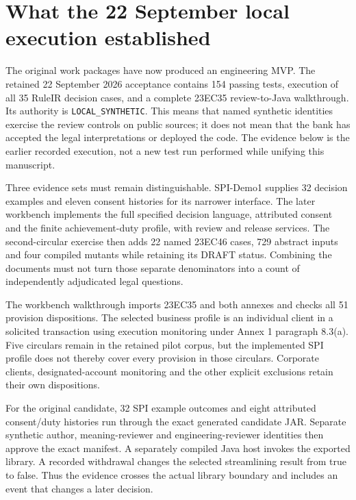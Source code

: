 \section{What the 22 September local execution established}
\label{sec:executed-workbench}

The original work packages have now produced an engineering MVP. The retained
22 September 2026 acceptance contains 154 passing tests, execution of all
35 RuleIR decision cases, and a complete 23EC35 review-to-Java walkthrough.
Its authority is \texttt{LOCAL\_SYNTHETIC}. This means that named synthetic
identities exercise the review controls on public sources; it does not mean
that the bank has accepted the legal interpretations or deployed the code.
The evidence below is the earlier recorded execution, not a new test run
performed while unifying this manuscript.

Three evidence sets must remain distinguishable. SPI-Demo1 supplies 32 decision
examples and eleven consent histories for its narrower interface. The later
workbench implements the full specified decision language, attributed consent
and the finite achievement-duty profile, with review and release services.
The second-circular exercise then adds 22 named 23EC46 cases, 729 abstract
inputs and four compiled mutants while retaining its DRAFT status. Combining
the documents must not turn those separate denominators into a count of
independently adjudicated legal questions.

The workbench walkthrough imports 23EC35 and both annexes and checks all
51 provision dispositions. The selected business profile is an individual
client in a solicited transaction using execution monitoring under Annex 1
paragraph 8.3(a). Five circulars remain in the retained pilot corpus, but the
implemented SPI profile does not thereby cover every provision in those
circulars. Corporate clients, designated-account monitoring and the other
explicit exclusions retain their own dispositions.

For the original candidate, 32 SPI example outcomes and eight attributed
consent/duty histories run through the exact generated candidate JAR.
Separate synthetic author, meaning-reviewer and engineering-reviewer identities
then approve the exact manifest. A separately compiled Java host invokes the
exported library. A recorded withdrawal changes the selected streamlining
result from true to false. Thus the evidence crosses the actual library
boundary and includes an event that changes a later decision.

